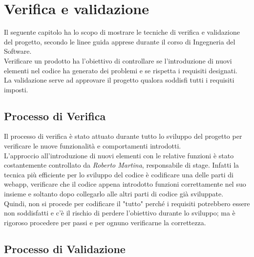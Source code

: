 \chapter{Verifica e validazione}
\label{cap:verifica-validazione}

Il seguente capitolo ha lo scopo di mostrare le tecniche di verifica e validazione del progetto, secondo le linee guida apprese durante il corso di Ingegneria del Software. \\
Verificare un prodotto ha l'obiettivo di controllare se l'introduzione di nuovi elementi nel codice ha generato dei problemi e se rispetta i requisiti designati. 
\\La validazione serve ad approvare il progetto qualora soddisfi tutti i requisiti imposti.

\section{Processo di Verifica}
Il processo di verifica è stato attuato durante tutto lo sviluppo del progetto per verificare le nuove funzionalità e comportamenti introdotti.\\
L'approccio all'introduzione di nuovi elementi con le relative funzioni è stato costantemente controllato da \textit{Roberto Martina}, responsabile di stage. Infatti  la tecnica più efficiente per lo sviluppo del codice è codificare una delle parti di webapp, verificare che il codice appena introdotto funzioni correttamente nel suo insieme e soltanto dopo collegarlo alle altri parti di codice già sviluppate.\\
Quindi, non si procede per codificare il "tutto" perché i requisiti potrebbero essere non soddisfatti e c'è il rischio di perdere l'obiettivo durante lo sviluppo; ma è rigoroso procedere per passi e per ognuno verificarne la correttezza.

\section{Processo di Validazione}
